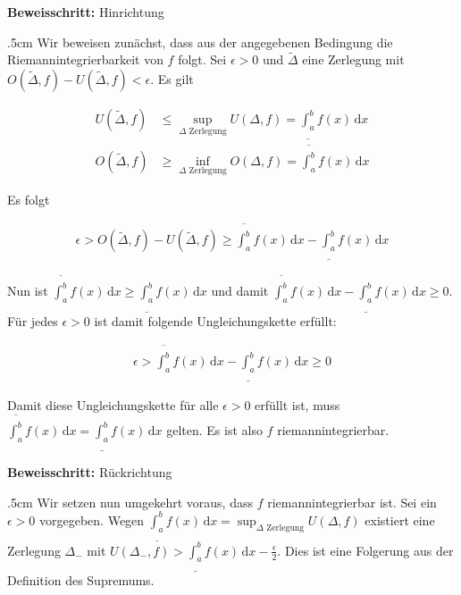 \documentclass[fontsize=9pt,
               parskip=half-,
               DIV=14,
               listof=chapterentry,
               tocflat]{scrbook}
\newenvironment{indentblock}{\begin{adjustwidth}{.5cm}{}}{\end{adjustwidth}}
\newcommand{\proofstep}[1]{\textbf{\textcolor{sblau}{#1}}}
\begin{document}
\begin{proof*}
\proofstep{Beweisschritt:}
 Hinrichtung\begin{indentblock}
Wir beweisen zunächst, dass aus der angegebenen Bedingung die Riemannintegrierbarkeit von $f$ folgt. Sei $\epsilon >0$ und ${\tilde {\Delta }}$ eine Zerlegung mit $O({\tilde {\Delta }},f)-U({\tilde {\Delta }},f)<\epsilon $. Es gilt

\begin{align*}
U({\tilde {\Delta }},f)&\leq \sup _{\Delta {\text{ Zerlegung}}}U(\Delta ,f)={\underline {\int _{a}^{b}}}f(x)\,\mathrm {d} x\\[0.3em]O({\tilde {\Delta }},f)&\geq \inf _{\Delta {\text{ Zerlegung}}}O(\Delta ,f)={\overline {\int _{a}^{b}}}f(x)\,\mathrm {d} x
\end{align*}

Es folgt

\begin{align*}
\epsilon >O({\tilde {\Delta }},f)-U({\tilde {\Delta }},f)\geq {\overline {\int _{a}^{b}}}f(x)\,\mathrm {d} x-{\underline {\int _{a}^{b}}}f(x)\,\mathrm {d} x
\end{align*}

Nun ist ${\overline {\int _{a}^{b}}}f(x)\,\mathrm {d} x\geq {\underline {\int _{a}^{b}}}f(x)\,\mathrm {d} x$ und damit ${\overline {\int _{a}^{b}}}f(x)\,\mathrm {d} x-{\underline {\int _{a}^{b}}}f(x)\,\mathrm {d} x\geq 0$. Für jedes $\epsilon >0$ ist damit folgende Ungleichungskette erfüllt:

\begin{align*}
\epsilon >{\overline {\int _{a}^{b}}}f(x)\,\mathrm {d} x-{\underline {\int _{a}^{b}}}f(x)\,\mathrm {d} x\geq 0
\end{align*}

Damit diese Ungleichungskette für alle $\epsilon >0$ erfüllt ist, muss ${\overline {\int _{a}^{b}}}f(x)\,\mathrm {d} x={\underline {\int _{a}^{b}}}f(x)\,\mathrm {d} x$ gelten. Es ist also $f$ riemannintegrierbar.

\end{indentblock}

\proofstep{Beweisschritt:}
 Rückrichtung\begin{indentblock}
Wir setzen nun umgekehrt voraus, dass $f$ riemannintegrierbar ist. Sei ein $\epsilon >0$ vorgegeben. Wegen ${\underline {\int _{a}^{b}}}f(x)\,\mathrm {d} x=\sup _{\Delta {\text{ Zerlegung}}}U(\Delta ,f)$ existiert eine Zerlegung $\Delta _{-}$ mit $U(\Delta _{-},f)>{\underline {\int _{a}^{b}}}f(x)\,\mathrm {d} x-{\tfrac {\epsilon }{2}}$. Dies ist eine Folgerung aus der Definition des Supremums.


\end{indentblock}
\end{proof*}
\end{document}
